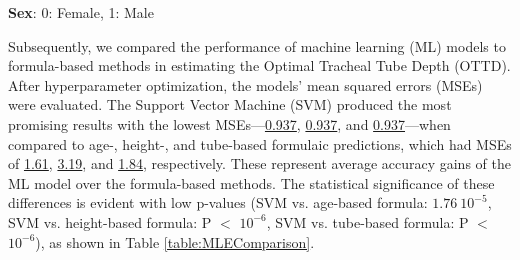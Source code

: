 \documentclass[11pt]{article}
\begin{document}
\begin{table}[h]
\caption{\protect\hyperlink{file-table-0-pkl}{Descriptive statistics of sex, age, height, and weight stratified by sex.}}
\label{table:DescriptiveStatistics}
\begin{threeparttable}
\renewcommand{\TPTminimum}{\linewidth}
\begin{tablenotes}
\footnotesize
\item \textbf{Sex}: 0: Female, 1: Male
\end{tablenotes}
\end{threeparttable}
\end{table}

Subsequently, we compared the performance of machine learning (ML) models to formula-based methods in estimating the Optimal Tracheal Tube Depth (OTTD). After hyperparameter optimization, the models' mean squared errors (MSEs) were evaluated. The Support Vector Machine (SVM) produced the most promising results with the lowest MSEs—\hyperlink{B3a}{0.937}, \hyperlink{B4a}{0.937}, and \hyperlink{B5a}{0.937}—when compared to age-, height-, and tube-based formulaic predictions, which had MSEs of \hyperlink{B3b}{1.61}, \hyperlink{B4b}{3.19}, and \hyperlink{B5b}{1.84}, respectively. These represent average accuracy gains of the ML model over the formula-based methods. The statistical significance of these differences is evident with low p-values (SVM vs. age-based formula: \hyperlink{B3c}{$1.76\ 10^{-5}$}, SVM vs. height-based formula: P $<$ \hyperlink{B4c}{$10^{-6}$}, SVM vs. tube-based formula: P $<$ \hyperlink{B5c}{$10^{-6}$}), as shown in Table \ref{table:MLEComparison}.
\end{document}
